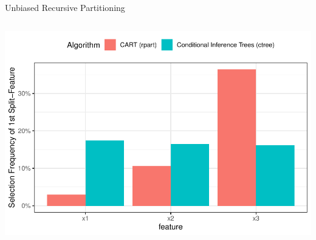 \documentclass[11pt,compress,t,notes=noshow, aspectratio=169, xcolor=table]{beamer}
\begin{document}
\begin{frame}{Unbiased Recursive Partitioning}
\begin{columns}[T, totalwidth = \textwidth]
\begin{column}{0.5\textwidth}
    \includegraphics[width = \textwidth]{figure/selection_bias_simulation_1000.pdf}
    \end{column}
\end{columns}
    
    
    

\end{frame}
\end{document}
